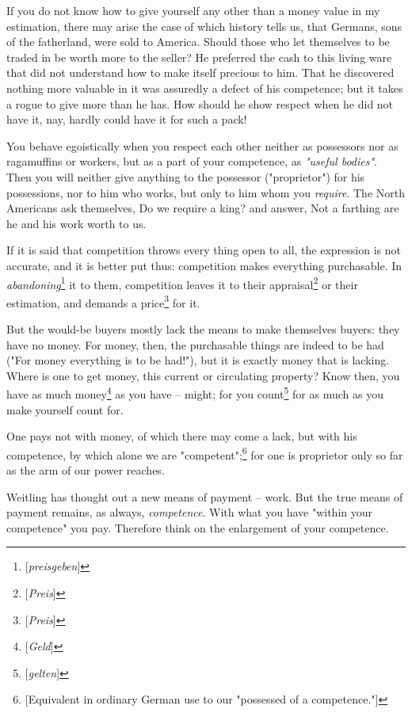 \documentclass[a4paper]{book}
\begin{document}
If you do not know how to give yourself any other than a money value in my 
estimation, there may arise the case of which history tells us, that Germans, 
sons of the fatherland, were sold to America. Should those who let themselves 
to be traded in be worth more to the seller? He preferred the cash to this 
living ware that did not understand how to make itself precious to him. That 
he discovered nothing more valuable in it was assuredly a defect of his 
competence; but it takes a rogue to give more than he has. How should he show 
respect when he did not have it, nay, hardly could have it for such a pack!

You behave egoistically when you respect each other neither as possessors nor 
as ragamuffins or workers, but as a part of your competence, as 
\textit{"{}useful bodies"{}}. Then you will neither give anything to the 
possessor ("{}proprietor"{}) for his possessions, nor to him who works, but 
only to him whom you \textit{require}. The North Americans ask themselves, Do 
we require a king? and answer, Not a farthing are he and his work worth to us.

If it is said that competition throws every thing open to all, the expression 
is not accurate, and it is better put thus: competition makes everything 
purchasable. In \textit{abandoning}\footnote{[\textit{preisgeben}]} it to 
them, competition leaves it to their appraisal\footnote{[\textit{Preis}]} or 
their estimation, and demands a price\footnote{[\textit{Preis}]} for it.

But the would-be buyers mostly lack the means to make themselves buyers: they 
have no money. For money, then, the purchasable things are indeed to be had 
("{}For money everything is to be had!"{}), but it is exactly money that is 
lacking. Where is one to get money, this current or circulating property? Know 
then, you have as much money\footnote{[\textit{Geld}]} as you have -- might; 
for you count\footnote{[\textit{gelten}]} for as much as you make yourself 
count for.

One pays not with money, of which there may come a lack, but with his 
competence, by which alone we are "{}competent"{};\footnote{[Equivalent in 
ordinary German use to our "{}possessed of a competence."{}]} for one is 
proprietor only so far as the arm of our power reaches.

Weitling has thought out a new means of payment -- work. But the true means of 
payment remains, as always, \textit{competence}. With what you have "{}within 
your competence"{} you pay. Therefore think on the enlargement of your 
competence.
\end{document}
